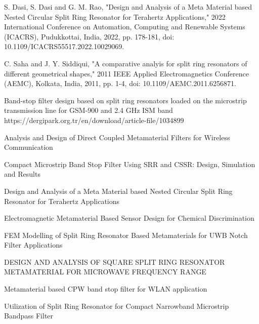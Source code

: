 \documentclass[conference]{IEEEtran}
\begin{document}
\begin{thebibliography}{00}
 S. Dasi, S. Dasi and G. M. Rao, "Design and Analysis of a Meta Material based Nested Circular Split Ring Resonator for Terahertz Applications," 2022 International Conference on Automation, Computing and Renewable Systems (ICACRS), Pudukkottai, India, 2022, pp. 178-181, doi: 10.1109/ICACRS55517.2022.10029069.

C. Saha and J. Y. Siddiqui, "A comparative analyis for split ring resonators of different geometrical shapes," 2011 IEEE Applied Electromagnetics Conference (AEMC), Kolkata, India, 2011, pp. 1-4, doi: 10.1109/AEMC.2011.6256871.

Band-stop filter design based on split ring resonators loaded on the microstrip 
transmission line for GSM-900 and 2.4 GHz ISM band https://dergipark.org.tr/en/download/article-file/1034899

Analysis and Design of Direct Coupled Metamaterial Filters for Wireless Communication


Compact Microstrip Band Stop Filter Using SRR and CSSR: Design, Simulation and Results

Design and Analysis of a Meta Material based Nested Circular Split Ring Resonator for Terahertz Applications 

Electromagnetic Metamaterial Based Sensor Design for Chemical Discrimination 

FEM Modelling of Split Ring Resonator Based Metamaterials for UWB Notch Filter Applications

DESIGN AND ANALYSIS OF SQUARE SPLIT RING RESONATOR METAMATERIAL FOR MICROWAVE FREQUENCY RANGE

Metamaterial based CPW band stop filter for WLAN application 

Utilization of Split Ring Resonator for Compact Narrowband Microstrip Bandpass Filter
\end{thebibliography}
\end{document}

